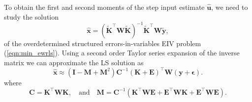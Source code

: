 To obtain the first and second moments of the step input estimate $\widehat{\mathbf{u}}$, we need to study the solution
\begin{equation} \widehat{\mathbf{x}} = ( \widetilde{\mathbf{K}}^\top \mathbf{W} \widetilde{\mathbf{K}}  )^{-1} \widetilde{\mathbf{K}}^\top \mathbf{W} \widetilde{\mathbf{y}} , \label{eqn:xhatW} \end{equation}
of the overdetermined structured errors-in-variables EIV problem (\ref{eqn:min_ewrls}).
Using a second order Taylor series expansion of the inverse matrix we can approximate the LS solution as
\begin{equation} \widehat{\mathbf{x}} \approx \left( \mathbf{I} - \mathbf{M} + \mathbf{M}^2 \right) \mathbf{C}^{-1} (\mathbf{K} + \mathbf{E})^\top \mathbf{W} (\mathbf{y} + \bm{\epsilon}). \label{eqn:xhatexpW} \end{equation} 
where 
\begin{equation} \mathbf{C} = \mathbf{K}^\top \mathbf{W} \mathbf{K}, \quad \text{and} \quad \mathbf{M} = \mathbf{C}^{-1} ( \mathbf{K}^\top \mathbf{W} \mathbf{E} + \mathbf{E}^\top \mathbf{W} \mathbf{K} + \mathbf{E}^\top \mathbf{W} \mathbf{E} ). \end{equation} 

